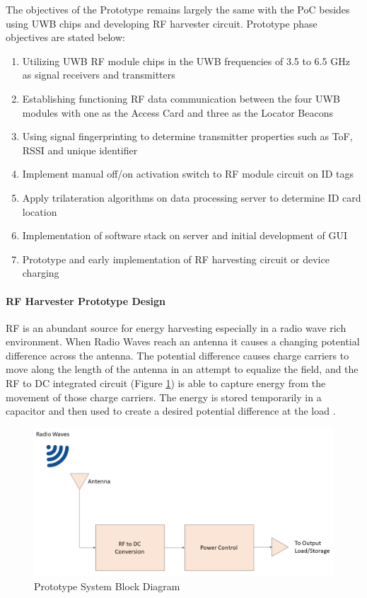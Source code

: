 The objectives of the Prototype remains largely the same with the PoC besides using UWB 
chips and developing RF harvester circuit. Prototype phase objectives are stated below:

\begin{enumerate}
    \item Utilizing UWB RF module chips in the UWB frequencies of 3.5 to 6.5 GHz as 
    signal receivers and transmitters
    \item Establishing functioning RF data communication between the four UWB modules 
    with one as the Access Card and three as the Locator Beacons
    \item Using signal fingerprinting to determine transmitter properties such as ToF, 
    RSSI and unique identifier
    \item Implement manual off/on activation switch to RF module circuit on ID tags
    \item Apply trilateration algorithms on data processing server to determine 
    ID card location
    \item Implementation of software stack on server and initial development of GUI  
    \item Prototype and early implementation of  RF harvesting circuit or device charging
\end{enumerate}

\break
\paragraph{RF Harvester Prototype Design}
\bigskip
RF is an abundant source for energy harvesting especially in a radio wave rich environment. When Radio Waves reach an antenna it causes a changing potential difference across the antenna. The potential difference causes charge carriers to move along the length of the antenna in an attempt to equalize the field, and the RF to \Gls{DC} integrated circuit (Figure \ref{fig:rfh}) is able to capture energy from the movement of those charge carriers. The energy is stored temporarily in a capacitor and then used to create a desired potential difference at the load \cite{R5}.
\begin{figure}[h!]
    \centering
    \includegraphics[width=\linewidth]{./images/rf_harvest.png}
    \caption{Prototype System Block Diagram}
    \label{fig:rfh}
\end{figure}

